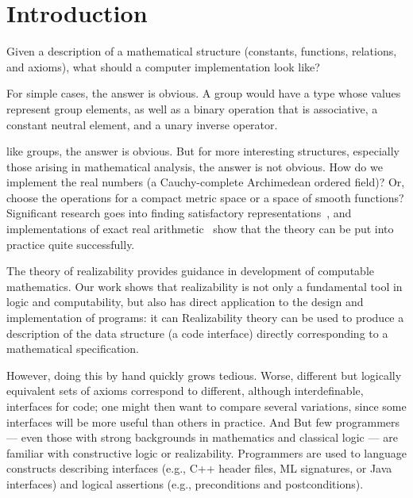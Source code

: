 \section{Introduction}
\label{sec:introduction}

Given a description of a mathematical structure (constants,
functions, relations, and axioms), what should a computer
implementation look like?

For simple cases,
\iflong
the answer is obvious. A
group would have a type whose values represent group elements, as well
as a binary operation that is associative, a constant 
neutral element, and a unary inverse operator.

\else %
like groups, the answer is obvious.
\fi %
%
But for more interesting structures, especially those arising in
mathematical analysis, the answer is not obvious. How do we
implement the real numbers (a Cauchy-complete Archimedean ordered
field)? Or, choose the operations for a compact metric
space or a space of smooth functions? Significant research goes into
finding satisfactory representations~\cite{Wei00,TZ98,Bla97,EL00}, and
implementations of exact real arithmetic~\cite{Mue00,Lam05a} show that
the theory can be put into practice quite successfully.

\iflong
The theory of realizability provides guidance in development of
computable mathematics.  Our work shows that realizability is
not only  a
fundamental tool in logic and computability, but also
has direct application to the design and implementation of programs:
it can
\else %
Realizability theory can be used to 
\fi %
produce a description of the data structure (a code interface)
directly corresponding to a mathematical specification.
%
\iflong

\fi %
%
\iflong
However, doing this by hand quickly grows tedious. 
Worse, different
but logically equivalent sets of axioms correspond to different,
although interdefinable, interfaces for code; one might then want to
compare several variations, since some interfaces will be more useful
than others in practice.
And 
\else
But
\fi %
few programmers --- even those with strong backgrounds in
mathematics and classical logic --- are familiar with constructive logic or
realizability. 
\iflong
Programmers are used to language constructs
describing interfaces (e.g., C++ header files, ML signatures, or Java
interfaces) and logical assertions (e.g., preconditions
and postconditions).
\fi

